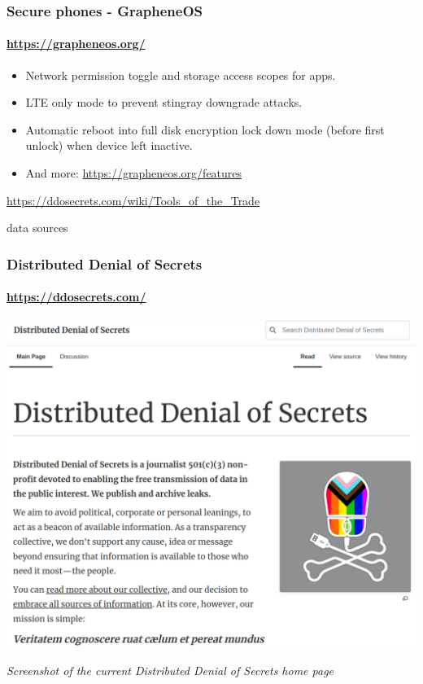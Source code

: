 \documentclass[aspectratio=169,usenames,dvipsnames]{beamer}
\begin{document}
\begin{frame}
  \frametitle{Secure phones - GrapheneOS}
  \framesubtitle{\url{https://grapheneos.org/}}

  \begin{itemize}[<+->]
    \item Network permission toggle and storage access scopes for apps.
    \item LTE only mode to prevent stingray downgrade attacks.
    \item Automatic reboot into full disk encryption lock down mode (before
      first unlock) when device left inactive.
    \item And more: \url{https://grapheneos.org/features}
  \end{itemize}

\end{frame}

\begin{frame}[c]

  \centering
  \url{https://ddosecrets.com/wiki/Tools_of_the_Trade}

\end{frame}

\begin{frame}[c]

  \LARGE
  \centering
  data sources

\end{frame}

\begin{frame}
  \frametitle{Distributed Denial of Secrets}
  \framesubtitle{\url{https://ddosecrets.com/}}

  \centering
  \includegraphics[width=\textwidth,height=0.6\textheight,keepaspectratio]{img/ddosecrets_current.png}

  \vfill \centering \footnotesize
  \emph{Screenshot of the current Distributed Denial of Secrets home page}

\end{frame}
\end{document}
